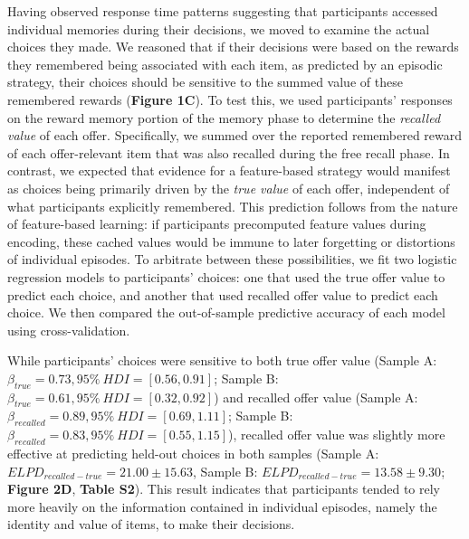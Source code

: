 \documentclass[10pt,letterpaper]{article}
\begin{document}
Having observed response time patterns suggesting that participants accessed individual memories during their decisions, we moved to examine the actual choices they made. We reasoned that if their decisions were based on the rewards they remembered being associated with each item, as predicted by an episodic strategy, their choices should be sensitive to the summed value of these remembered rewards (\textbf{Figure 1C}). To test this, we used participants' responses on the reward memory portion of the memory phase to determine the \textit{recalled value} of each offer. Specifically, we summed over the reported remembered reward of each offer-relevant item that was also recalled during the free recall phase. In contrast, we expected that evidence for a feature-based strategy would manifest as choices being primarily driven by the \textit{true value} of each offer, independent of what participants explicitly remembered. This prediction follows from the nature of feature-based learning: if participants precomputed feature values during encoding, these cached values would be immune to later forgetting or distortions of individual episodes. To arbitrate between these possibilities, we fit two logistic regression models to participants' choices: one that used the true offer value to predict each choice, and another that used recalled offer value to predict each choice. We then compared the out-of-sample predictive accuracy of each model using cross-validation.

While participants' choices were sensitive to both true offer value (Sample A: $\beta_{true} = 0.73, 95\% \ HDI = [0.56, 0.91]$; Sample B: $\beta_{true} = 0.61, 95\% \ HDI = [0.32, 0.92]$) and recalled offer value (Sample A: $\beta_{recalled} = 0.89, 95\% \ HDI = [0.69, 1.11]$; Sample B: $\beta_{recalled} = 0.83, 95\% \ HDI = [0.55, 1.15]$), recalled offer value was slightly more effective at predicting held-out choices in both samples (Sample A: $ELPD_{recalled-true} = 21.00 \pm 15.63$, Sample B: $ELPD_{recalled-true} = 13.58 \pm 9.30$; \textbf{Figure 2D}, \textbf{Table S2}). This result indicates that participants tended to rely more heavily on the information contained in individual episodes, namely the identity and value of items, to make their decisions.
\end{document}
